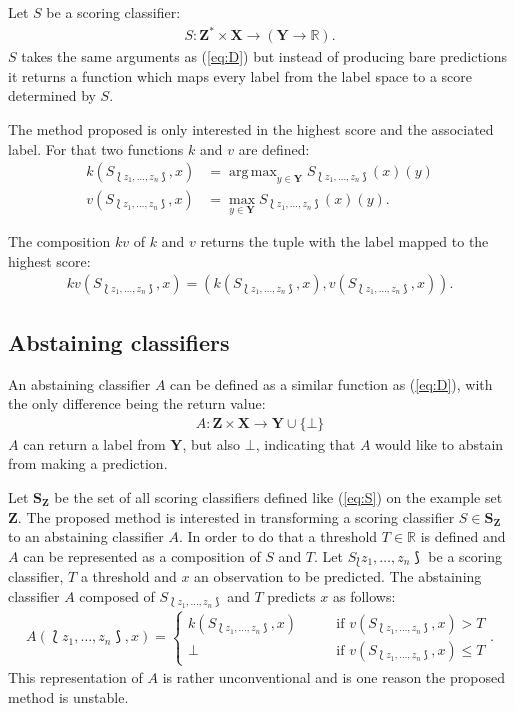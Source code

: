 \documentclass[twoside,11pt]{article}
\DeclareMathOperator*{\argmax}{arg\,max}
\def\ds{\Lbag z_1,\dots,z_n \Rbag}
\def\Z{\textbf{Z}}
\def\S{\textbf{S}_{\Z}}
\begin{document}
Let $S$ be a scoring classifier:
\begin{align}
  \label{eq:S}
  S: \textbf{Z}^* \times \textbf{X} \rightarrow
     (\textbf{Y} \rightarrow \mathbb{R}).
\end{align}
$S$ takes the same arguments as (\ref{eq:D}) but instead
of producing bare predictions it returns a function which
maps every label from the label space to a score
determined by $S$.

The method proposed is only interested in the highest
score and the associated label. For that two functions
$k$ and $v$ are defined:
\begin{align*}
  k(S_{\ds}, x) &= \argmax_{y \in \textbf{Y}}
    S_{\ds}(x)(y) \\
  v(S_{\ds}, x) &= \max_{y \in \textbf{Y}}
    S_{\ds}(x)(y).
\end{align*}

The composition $kv$ of $k$ and $v$ returns the tuple with
the label mapped to the highest score:
\begin{align}
  \label{eq:kv}
  kv(S_{\ds}, x) = (k(S_{\ds}, x), v(S_{\ds}, x)).
\end{align}

\subsection{Abstaining classifiers}

An abstaining classifier $A$ can be defined as a similar
function as (\ref{eq:D}), with the only difference being
the return value:
\begin{align*}
  A: \textbf{Z} \times \textbf{X} \rightarrow
      \textbf{Y} \cup \{\bot\}
\end{align*}
$A$ can return a label from $\textbf{Y}$, but also $\bot$,
indicating that $A$ would like to abstain from making a
prediction.

Let $\S$ be the set of all scoring classifiers defined like
(\ref{eq:S}) on the example set $\Z$.
The proposed method is interested in transforming a
scoring classifier $S \in \S$ to an abstaining classifier
$A$.
In order to do that a threshold $T \in \mathbb{R}$ is
defined and $A$ can be represented as a composition of $S$
and $T$.
Let $S_\ds$ be a scoring classifier, $T$ a threshold and
$x$ an observation to be predicted.
The abstaining classifier $A$ composed of $S_{\ds}$ and $T$
predicts $x$ as follows:
\begin{align*}
  A(\ds, x) =
    \begin{cases}
      k(S_{\ds}, x) &\qquad \text{if } v(S_{\ds}, x) > T \\
      \bot &\qquad \text{if } v(S_{\ds}, x) \leq T
    \end{cases}.
\end{align*}
This representation of $A$ is rather unconventional and
is one reason the proposed method is unstable.
\end{document}
